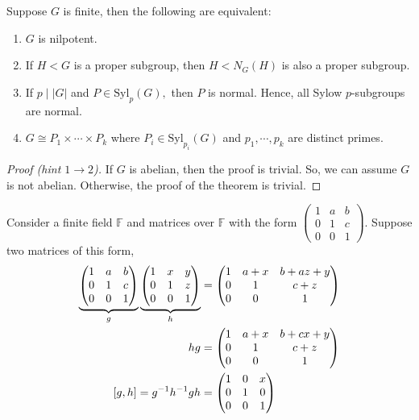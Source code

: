 \documentclass[a4paper]{article}
\begin{document}
\begin{theorem}
    Suppose $G$ is finite, then the following are equivalent: \begin{enumerate}
        \item $G$ is nilpotent.
        \item If $H<G$ is a proper subgroup, then $H<N_G(H)$ is also a proper subgroup.
        \item If $p\mid |G|$ and $P\in \mathrm{Syl}_p(G),$ then $P$ is normal. Hence, all Sylow $p$-subgroups are normal.
        \item $G\cong P_1\times\cdots\times P_k$ where $P_i\in\mathrm{Syl}_{p_i}(G)$ and $p_1,\cdots,p_k$ are distinct primes. 
    \end{enumerate}
    \begin{proof}[Proof (hint $1\to 2$)]
        If $G$ is abelian, then the proof is trivial. So, we can assume $G$ is not abelian. Otherwise, the proof of the theorem is trivial.
    \end{proof}
\end{theorem}
Consider a finite field $\mathbb F$ and matrices over $\mathbb F$ with the form $\begin{pmatrix}
    1&a&b\\0&1&c\\0&0&1
\end{pmatrix}.$ Suppose two matrices of this form, \begin{align}
    \underbrace{\begin{pmatrix}
    1&a&b\\0&1&c\\0&0&1
\end{pmatrix}}_g\underbrace{\begin{pmatrix}
    1&x&y\\0&1&z\\0&0&1
\end{pmatrix}}_h&=\begin{pmatrix}
    1&a+x&b+az+y\\0&1&c+z\\0&0&1
\end{pmatrix}\\
hg&=\begin{pmatrix}
    1&a+x&b+cx+y\\0&1&c+z\\0&0&1
\end{pmatrix}\\
[g,h]=g^{-1} h^{-1} gh&=\begin{pmatrix}
    1&0&x\\0&1&0\\0&0&1
\end{pmatrix}
\end{align}
\end{document}
